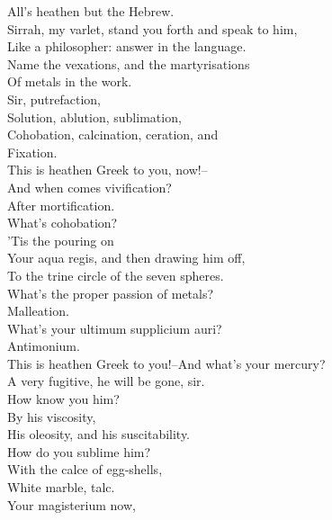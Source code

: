 \documentclass{memoir}
\begin{document}
\begin{drama*}
\ananiasspeaks {} All's heathen but the Hebrew.\\
\subtlespeaks  Sirrah, my varlet, stand you forth and speak to him,\\
 Like a philosopher: answer in the language.\\
 Name the vexations, and the martyrisations\\
 Of metals in the work.\\
\facespeaks {} Sir, putrefaction,\\
 Solution, ablution, sublimation,\\
 Cohobation, calcination, ceration, and\\
 Fixation.\\
\subtlespeaks {} This is heathen Greek to you, now!--\\
 And when comes vivification?\\
\facespeaks {} After mortification.\\
\subtlespeaks  What's cohobation?\\
\facespeaks {} 'Tis the pouring on\\
 Your aqua regis, and then drawing him off,\\
 To the trine circle of the seven spheres.\\
\subtlespeaks  What's the proper passion of metals?\\
\facespeaks {} Malleation.\\
\subtlespeaks  What's your ultimum supplicium auri?\\
\facespeaks  Antimonium.\\
\subtlespeaks {} This is heathen Greek to you!--And what's your mercury?\\
\facespeaks  A very fugitive, he will be gone, sir.\\
\subtlespeaks  How know you him?\\
\facespeaks {} By his viscosity,\\
 His oleosity, and his suscitability.\\
\subtlespeaks  How do you sublime him?\\
\facespeaks {} With the calce of egg-shells,\\
 White marble, talc.\\
\subtlespeaks {} Your magisterium now,\\

\end{drama*}
\end{document}
